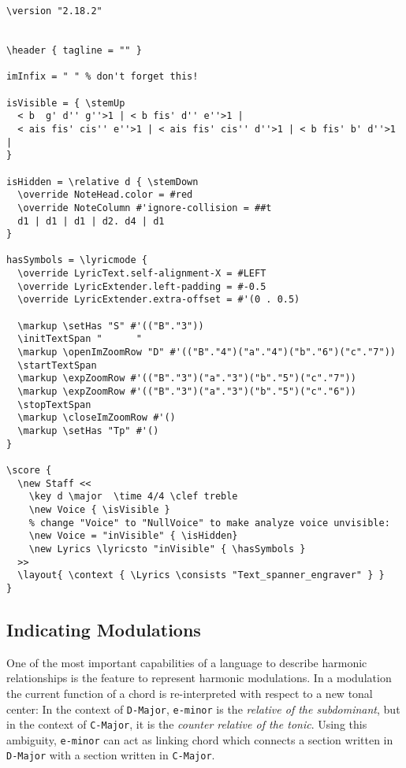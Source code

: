 \documentclass[
  DIV=calc,
  BCOR=5mm,
  12pt,
  headings=small,
  oneside,
  abstract=true,
  toc=bib,
  xcolor=dvipsnames,
  openany,
  english]{scrartcl}
\newcommand{\acc}[0]{\textit}
\begin{document}
\begin{scriptsize}
\begin{verbatim}
\version "2.18.2"


\header { tagline = "" }

imInfix = " " % don't forget this!

isVisible = { \stemUp
  < b  g' d'' g''>1 | < b fis' d'' e''>1 |
  < ais fis' cis'' e''>1 | < ais fis' cis'' d''>1 | < b fis' b' d''>1 |
}

isHidden = \relative d { \stemDown
  \override NoteHead.color = #red
  \override NoteColumn #'ignore-collision = ##t
  d1 | d1 | d1 | d2. d4 | d1
}

hasSymbols = \lyricmode {
  \override LyricText.self-alignment-X = #LEFT
  \override LyricExtender.left-padding = #-0.5
  \override LyricExtender.extra-offset = #'(0 . 0.5)

  \markup \setHas "S" #'(("B"."3"))
  \initTextSpan "      "
  \markup \openImZoomRow "D" #'(("B"."4")("a"."4")("b"."6")("c"."7"))
  \startTextSpan
  \markup \expZoomRow #'(("B"."3")("a"."3")("b"."5")("c"."7"))
  \markup \expZoomRow #'(("B"."3")("a"."3")("b"."5")("c"."6"))
  \stopTextSpan
  \markup \closeImZoomRow #'()
  \markup \setHas "Tp" #'()
}

\score {
  \new Staff <<
    \key d \major  \time 4/4 \clef treble
    \new Voice { \isVisible }
    % change "Voice" to "NullVoice" to make analyze voice unvisible:
    \new Voice = "inVisible" { \isHidden}
    \new Lyrics \lyricsto "inVisible" { \hasSymbols }
  >>
  \layout{ \context { \Lyrics \consists "Text_spanner_engraver" } }
}

\end{verbatim}
\end{scriptsize}

\subsection{Indicating Modulations}

One of the most important capabilities of a language to describe harmonic
relationships is the feature to represent harmonic modulations. In a modulation
the current function of a chord is re-interpreted with respect to a new tonal
center: In the context of \texttt{D-Major}, \texttt{e-minor} is the
\acc{relative of the subdominant}, but in the context of \texttt{C-Major}, it is
the \acc{counter relative of the tonic}. Using this ambiguity, \texttt{e-minor}
can act as linking chord which connects a section written in \texttt{D-Major}
with a section written in \texttt{C-Major}.
\end{document}
